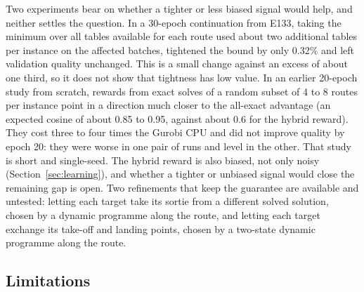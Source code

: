\documentclass[preprint,12pt,authoryear]{elsarticle}
\begin{document}
Two experiments bear on whether a tighter or less biased signal would help, and neither settles the question. In a 30-epoch continuation from E133, taking the minimum over all tables available for each route used about two additional tables per instance on the affected batches, tightened the bound by only 0.32\% and left validation quality unchanged. This is a small change against an excess of about one third, so it does not show that tightness has low value. In an earlier 20-epoch study from scratch, rewards from exact solves of a random subset of 4 to 8 routes per instance point in a direction much closer to the all-exact advantage (an expected cosine of about 0.85 to 0.95, against about 0.6 for the hybrid reward). They cost three to four times the Gurobi CPU and did not improve quality by epoch 20: they were worse in one pair of runs and level in the other. That study is short and single-seed. The hybrid reward is also biased, not only noisy (Section~\ref{sec:learning}), and whether a tighter or unbiased signal would close the remaining gap is open. Two refinements that keep the guarantee are available and untested: letting each target take its sortie from a different solved solution, chosen by a dynamic programme along the route, and letting each target exchange its take-off and landing points, chosen by a two-state dynamic programme along the route.

\subsection{Limitations}
\label{sec:limits}
\end{document}
